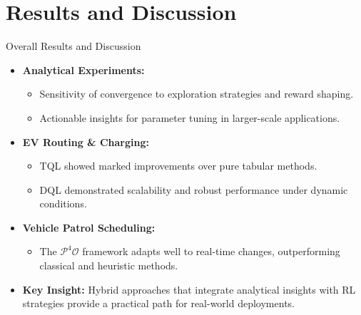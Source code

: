 \documentclass{beamer}
\begin{document}
\section{Results and Discussion}
\begin{frame}{Overall Results and Discussion}
  \begin{itemize}[<+->]
    \item \textbf{Analytical Experiments:}
      \begin{itemize}[<+->]
        \item Sensitivity of convergence to exploration strategies and reward shaping.
        \item Actionable insights for parameter tuning in larger-scale applications.
      \end{itemize}
    \item \textbf{EV Routing \& Charging:}
      \begin{itemize}[<+->]
        \item TQL showed marked improvements over pure tabular methods.
        \item DQL demonstrated scalability and robust performance under dynamic conditions.
      \end{itemize}
    \item \textbf{Vehicle Patrol Scheduling:}
      \begin{itemize}[<+->]
        \item The $\mathcal{P}^4\mathcal{O}$ framework adapts well to real-time changes, outperforming classical and heuristic methods.
      \end{itemize}
    \item \textbf{Key Insight:} Hybrid approaches that integrate analytical insights with RL strategies provide a practical path for real-world deployments.
  \end{itemize}
\end{frame}
\end{document}

